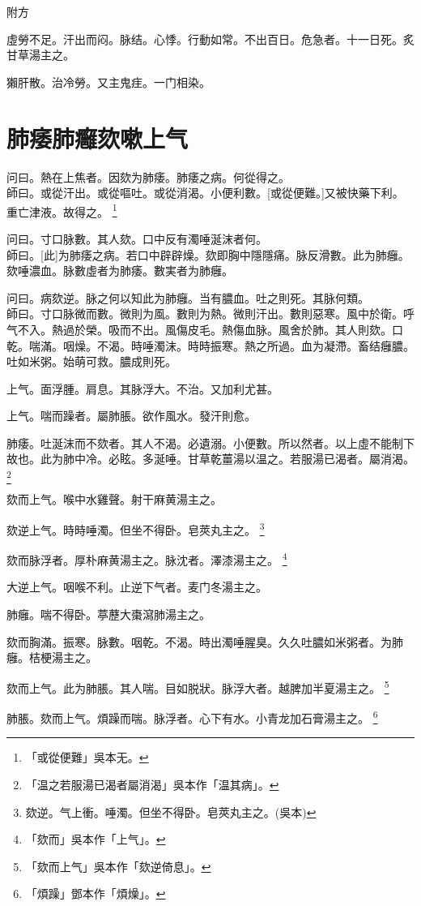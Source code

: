 \documentclass[11pt,oneside,b5paper]{ctexbook}
\begin{document}
\begin{flushleft}
附方

虛勞不足。汗出而闷。脉结。心悸。行動如常。不出百日。危急者。十一日死。炙甘草湯主之。

獺肝散。治冷勞。又主鬼疰。一门相染。

\chapter{肺痿肺癰欬嗽上气}

问曰。熱在上焦者。因欬为肺痿。肺痿之病。何從得之。\\
師曰。或從汗出。或從嘔吐。或從消渴。小便利數。[或從便難。]又被快藥下利。重亡津液。故得之。
\footnote{「或從便難」吳本无。}

问曰。寸口脉數。其人欬。口中反有濁唾涎沫者何。\\
師曰。[此]为肺痿之病。若口中辟辟燥。欬即胸中隱隱痛。脉反滑數。此为肺癰。欬唾濃血。脉數虛者为肺痿。數実者为肺癰。

问曰。病欬逆。脉之何以知此为肺癰。当有膿血。吐之則死。其脉何類。\\
師曰。寸口脉微而數。微則为風。數則为熱。微則汗出。數則惡寒。風中於衛。呼气不入。熱過於榮。吸而不出。風傷皮毛。熱傷血脉。風舍於肺。其人則欬。口乾。喘滿。咽燥。不渴。時唾濁沫。時時振寒。熱之所過。血为凝滯。畜结癰膿。吐如米粥。始萌可救。膿成則死。

上气。面浮腫。肩息。其脉浮大。不治。又加利尤甚。

上气。喘而躁者。屬肺脹。欲作風水。發汗則愈。

肺痿。吐涎沫而不欬者。其人不渴。必遺溺。小便數。所以然者。以上虛不能制下故也。此为肺中冷。必眩。多涎唾。甘草乾薑湯以温之。若服湯已渴者。屬消渴。
\footnote{「温之若服湯已渴者屬消渴」吳本作「温其病」。}

欬而上气。喉中水雞聲。射干麻黄湯主之。

欬逆上气。時時唾濁。但坐不得卧。皂莢丸主之。
\footnote{欬逆。气上衝。唾濁。但坐不得卧。皂莢丸主之。(吳本)}

欬而脉浮者。厚朴麻黄湯主之。脉沈者。澤漆湯主之。
\footnote{「欬而」吳本作「上气」。}

大逆上气。咽喉不利。止逆下气者。麦门冬湯主之。

肺癰。喘不得卧。葶藶大棗瀉肺湯主之。

欬而胸滿。振寒。脉數。咽乾。不渴。時出濁唾腥臭。久久吐膿如米粥者。为肺癰。桔梗湯主之。

欬而上气。此为肺脹。其人喘。目如脱狀。脉浮大者。越脾加半夏湯主之。
\footnote{「欬而上气」吳本作「欬逆倚息」。}

肺脹。欬而上气。煩躁而喘。脉浮者。心下有水。小青龙加石膏湯主之。
\footnote{「煩躁」鄧本作「煩燥」。}


\end{flushleft}
\end{document}
